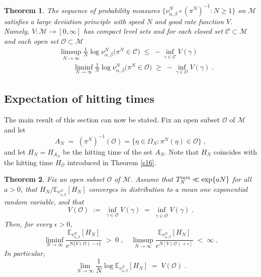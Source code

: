 \documentclass[reqno]{amsart}
\newtheorem{theorem}{Theorem}[section]
\begin{document}
\begin{theorem}
\label{s09}
The sequence of probability measures $\{\nu^N_{\alpha, \beta} \circ
(\pi^N)^{-1} : N\ge 1\}$ on ${{\mathscr M}}$ satisfies a large deviation
principle with speed $N$ and good rate function $V$.  Namely, $V: {{\mathscr M}} \to [0,\infty]$ has compact level sets and for each closed set ${{\mathscr C}} \subset {{\mathscr M}}$ and each open set ${{\mathscr O}} \subset {{\mathscr M}}$
\begin{eqnarray*}
&& 
\limsup_{N\to\infty} \frac 1N \log \nu^N_{\alpha, \beta}
\big( \pi^N \in {{\mathscr C}}\big)
\;\leq\; - \inf_{\gamma \in {{\mathscr C}}} V(\gamma)  
\\
&& \qquad 
\liminf_{N\to\infty} \frac 1N \log \nu^N_{\alpha, \beta}
\big( \pi^N\in {{\mathscr O}} \big) \;\geq\; -  \inf_{\gamma \in {{\mathscr O}}} 
V(\gamma) \; . 
\end{eqnarray*}
\end{theorem}

\subsection*{Expectation of hitting times}

The main result of this section can now be stated. Fix an open subset
${{\mathscr O}}$ of ${{\mathscr M}}$ and let 
\begin{equation*}
A_N \;=\; (\pi^N)^{-1}({{\mathscr O}}) = \{\eta\in\Omega_N : 
\pi^N(\eta)\in {{\mathscr O}}\}\;,
\end{equation*}
and let $H_N = H_{A_N}$ be the hitting time of the set $A_N$. Note
that $H_N$ coincides with the hitting time $H_{{{\mathscr O}}}$ introduced in
Theorem \ref{s16}.

\begin{theorem}
\label{s06}
Fix an open subset ${{\mathscr O}}$ of ${{\mathscr M}}$. Assume that $T^{\rm mix}_N
\ll \exp\{aN\}$ for all $a>0$, that $H_N/{{\mathbb E}}_{\nu^N_{\alpha, \beta}}
[H_N]$ converges in distribution to a mean one exponential random
variable, and that
\begin{equation*}
V({{\mathscr O}}) \;:=\; \inf_{\gamma \in {{\mathscr O}}} V(\gamma) 
\;=\; \inf_{\gamma \in \overline{{{\mathscr O}}}} V(\gamma)\;.
\end{equation*}
Then, for every $\epsilon>0$,
\begin{equation*}
\liminf_{N\to\infty} \frac {{{\mathbb E}}_{\nu^N_{\alpha, \beta}} [H_N]}
{e^{N \{ V({{\mathscr O}}) - \epsilon\}}} \;>\; 0\;, \quad 
\limsup_{N\to\infty} 
\frac {{{\mathbb E}}_{\nu^N_{\alpha, \beta}}[H_N]}
{e^{N [V({{\mathscr O}}) + \epsilon]}}
\;<\; \infty \;.
\end{equation*}
In particular,
\begin{equation*}
\lim_{N\to\infty} \frac 1N \log 
{{\mathbb E}}_{\nu^N_{\alpha, \beta}}[H_N] \;=\; V({{\mathscr O}})\;.
\end{equation*}
\end{theorem}
\end{document}
